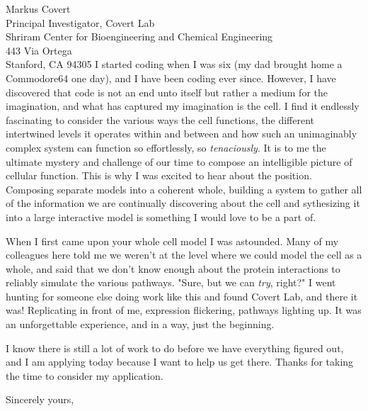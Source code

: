 \documentclass[11pt]{letter} %
\begin{document}
\begin{letter}{Markus Covert \\
Principal Investigator, Covert Lab \\
Shriram Center for Bioengineering and Chemical Engineering \\
443 Via Ortega \\
Stanford, CA 94305}
I started coding when I was six (my dad brought home a Commodore64 one day), and I have been coding ever since. However, I have discovered that code is not an end unto itself but rather a medium for the imagination, and what has captured my imagination is the cell. I find it endlessly fascinating to consider the various ways the cell functions, the different intertwined levels it operates within and between and how such an unimaginably complex system can function so effortlessly, so \textit{tenaciously}. It is to me the ultimate mystery and challenge of our time to compose an intelligible picture of cellular function. This is why I was excited to hear about the position. Composing separate models into a coherent whole, building a system to gather all of the information we are continually discovering about the cell and sythesizing it into a large interactive model is something I would love to be a part of. 

When I first came upon your whole cell model I was astounded. Many of my colleagues here told me we weren't at the level where we could model the cell as a whole, and said that we don't know enough about the protein interactions to reliably simulate the various pathways. "Sure, but we can \textit{try}, right?" I went hunting for someone else doing work like this and found Covert Lab, and there it was! Replicating in front of me, expression flickering, pathways lighting up. It was an unforgettable experience, and in a way, just the beginning.

I know there is still a lot of work to do before we have everything figured out, and I am applying today because I want to help us get there. Thanks for taking the time to consider my application.

\closing{Sincerely yours,}




\end{letter}
\end{document}
